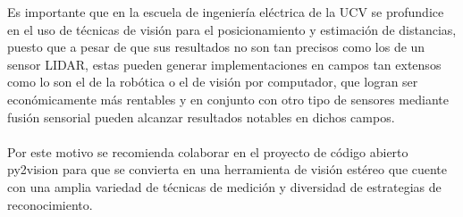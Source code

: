Es importante que en la escuela de ingeniería eléctrica de la UCV se profundice en el uso de técnicas de visión para el posicionamiento y estimación de distancias, puesto que a pesar de que sus resultados no son tan precisos como los de un sensor LIDAR, estas pueden generar implementaciones en campos tan extensos como lo son el de la robótica o el de visión por computador, que logran ser económicamente más rentables y en conjunto con otro tipo de sensores mediante fusión sensorial pueden alcanzar resultados notables en dichos campos.
\\
\\
Por este motivo se recomienda colaborar en el proyecto de código abierto py2vision para que se convierta en una herramienta de visión estéreo que cuente con una amplia variedad de técnicas de medición y diversidad de estrategias de reconocimiento.